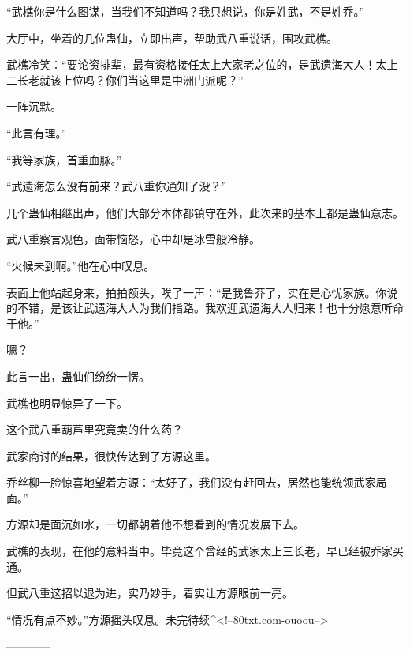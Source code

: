 \begin{this_body}
“武樵你是什么图谋，当我们不知道吗？我只想说，你是姓武，不是姓乔。”

大厅中，坐着的几位蛊仙，立即出声，帮助武八重说话，围攻武樵。

武樵冷笑：“要论资排辈，最有资格接任太上大家老之位的，是武遗海大人！太上二长老就该上位吗？你们当这里是中洲门派呢？”

一阵沉默。

“此言有理。”

“我等家族，首重血脉。”

“武遗海怎么没有前来？武八重你通知了没？”

几个蛊仙相继出声，他们大部分本体都镇守在外，此次来的基本上都是蛊仙意志。

武八重察言观色，面带恼怒，心中却是冰雪般冷静。

“火候未到啊。”他在心中叹息。

表面上他站起身来，拍拍额头，唉了一声：“是我鲁莽了，实在是心忧家族。你说的不错，是该让武遗海大人为我们指路。我欢迎武遗海大人归来！也十分愿意听命于他。”

嗯？

此言一出，蛊仙们纷纷一愣。

武樵也明显惊异了一下。

这个武八重葫芦里究竟卖的什么药？

武家商讨的结果，很快传达到了方源这里。

乔丝柳一脸惊喜地望着方源：“太好了，我们没有赶回去，居然也能统领武家局面。”

方源却是面沉如水，一切都朝着他不想看到的情况发展下去。

武樵的表现，在他的意料当中。毕竟这个曾经的武家太上三长老，早已经被乔家买通。

但武八重这招以退为进，实乃妙手，着实让方源眼前一亮。

“情况有点不妙。”方源摇头叹息。未完待续\^{}<!--80txt.com-ouoou-->

------------

\end{this_body}


